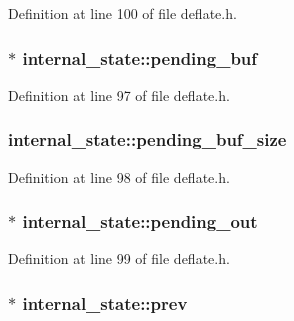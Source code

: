 Definition at line 100 of file deflate.\-h.

\hypertarget{structinternal__state_ae5f393e8d0d569da6038749768f65b94}{
\subsubsection[{pending\-\_\-buf}]{$\ast$ internal\-\_\-state\-::pending\-\_\-buf}}\label{structinternal__state_ae5f393e8d0d569da6038749768f65b94}


Definition at line 97 of file deflate.\-h.

\hypertarget{structinternal__state_a9100ecccf2f8bb474f0bcc7c69f55c27}{
\subsubsection[{pending\-\_\-buf\-\_\-size}]{ internal\-\_\-state\-::pending\-\_\-buf\-\_\-size}}\label{structinternal__state_a9100ecccf2f8bb474f0bcc7c69f55c27}


Definition at line 98 of file deflate.\-h.

\hypertarget{structinternal__state_a6e15ed78675c3c7bdb312623b5eceb7a}{
\subsubsection[{pending\-\_\-out}]{$\ast$ internal\-\_\-state\-::pending\-\_\-out}}\label{structinternal__state_a6e15ed78675c3c7bdb312623b5eceb7a}


Definition at line 99 of file deflate.\-h.

\hypertarget{structinternal__state_a93a7407be4c9df81f71a389eb1ff6c57}{
\subsubsection[{prev}]{$\ast$ internal\-\_\-state\-::prev}}\label{structinternal__state_a93a7407be4c9df81f71a389eb1ff6c57}


